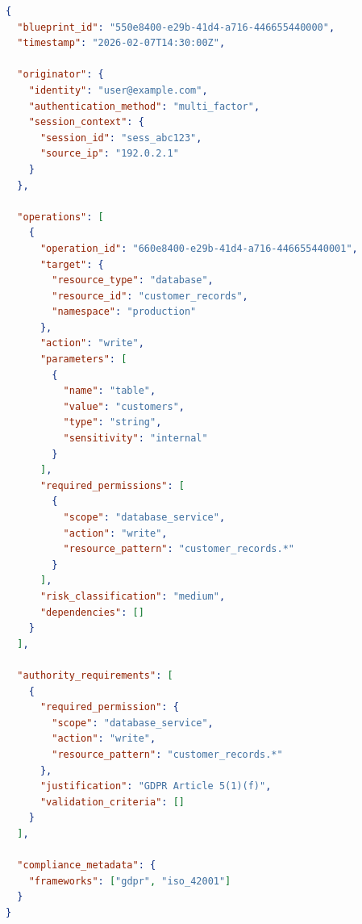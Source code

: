 \documentclass[11pt,letterpaper]{article}
\begin{document}
\begin{lstlisting}[language=json,caption=Sample Blueprint Instance]
{
  "blueprint_id": "550e8400-e29b-41d4-a716-446655440000",
  "timestamp": "2026-02-07T14:30:00Z",
  
  "originator": {
    "identity": "user@example.com",
    "authentication_method": "multi_factor",
    "session_context": {
      "session_id": "sess_abc123",
      "source_ip": "192.0.2.1"
    }
  },
  
  "operations": [
    {
      "operation_id": "660e8400-e29b-41d4-a716-446655440001",
      "target": {
        "resource_type": "database",
        "resource_id": "customer_records",
        "namespace": "production"
      },
      "action": "write",
      "parameters": [
        {
          "name": "table",
          "value": "customers",
          "type": "string",
          "sensitivity": "internal"
        }
      ],
      "required_permissions": [
        {
          "scope": "database_service",
          "action": "write",
          "resource_pattern": "customer_records.*"
        }
      ],
      "risk_classification": "medium",
      "dependencies": []
    }
  ],
  
  "authority_requirements": [
    {
      "required_permission": {
        "scope": "database_service",
        "action": "write",
        "resource_pattern": "customer_records.*"
      },
      "justification": "GDPR Article 5(1)(f)",
      "validation_criteria": []
    }
  ],
  
  "compliance_metadata": {
    "frameworks": ["gdpr", "iso_42001"]
  }
}
\end{lstlisting}
\end{document}
